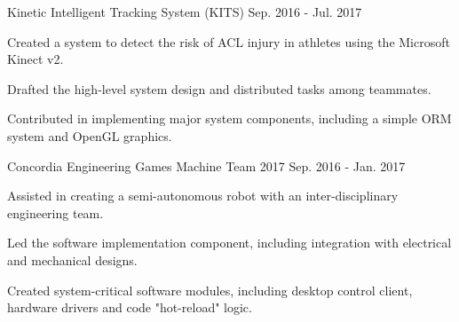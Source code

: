 

\begin{cventries}

  \vspace{1.5mm} %
  \cventry
    {Kinetic Intelligent Tracking System (KITS)} %
    {} %
    {} %
    {Sep. 2016 - Jul. 2017} %
    {
      \begin{cvitems} %
        \item {Created a system to detect the risk of ACL injury in athletes using the Microsoft Kinect v2.}
        \item {Drafted the high-level system design and distributed tasks among teammates.}
        \item {Contributed in implementing major system components, including a simple ORM system and OpenGL graphics.}
        \\
      \end{cvitems}
    }

  \cventry
    {Concordia Engineering Games Machine Team 2017} %
    {} %
    {} %
    {Sep. 2016 - Jan. 2017} %
    {
      \begin{cvitems} %
        \item {Assisted in creating a semi-autonomous robot with an inter-disciplinary engineering team.}
        \item {Led the software implementation component, including integration with electrical and mechanical designs.}
        \item {Created system-critical software modules, including desktop control client, hardware drivers and code "hot-reload" logic.}
        \\
      \end{cvitems}
    }
    

\end{cventries}
